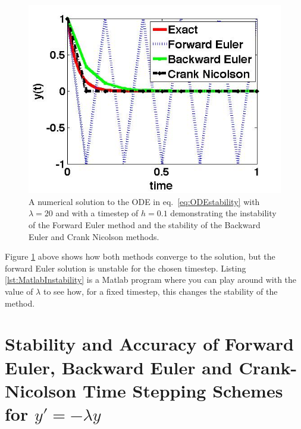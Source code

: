 \begin{figure}[h]
\begin{center}
\includegraphics[scale=.4]{./Timestepping/unstable_forward_Euler.jpg}
\caption{A numerical solution to the ODE in eq.\ \eqref{eq:ODEstability} with $\lambda=20$ and with a timestep of $h=0.1$ demonstrating the instability of the Forward Euler method and the stability of the Backward Euler and Crank Nicolson methods.} \label{fig:ODEstability}
\end{center}
\end{figure}
Figure \ref{fig:ODEstability} above shows how both methods converge to the solution, but the forward Euler solution is unstable for the chosen timestep. Listing \ref{lst:MatlabInstability} is a Matlab program where you can play around with the value of $\lambda$ to see how, for a fixed timestep, this changes the stability of the method. 


\section{Stability and Accuracy of Forward Euler, Backward Euler and Crank-Nicolson Time Stepping Schemes for $y'=-\lambda y$}


